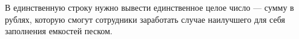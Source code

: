 В единственную строку нужно вывести единственное целое число --- сумму в рублях, которую смогут сотрудники заработать случае наилучшего для себя заполнения емкостей песком.